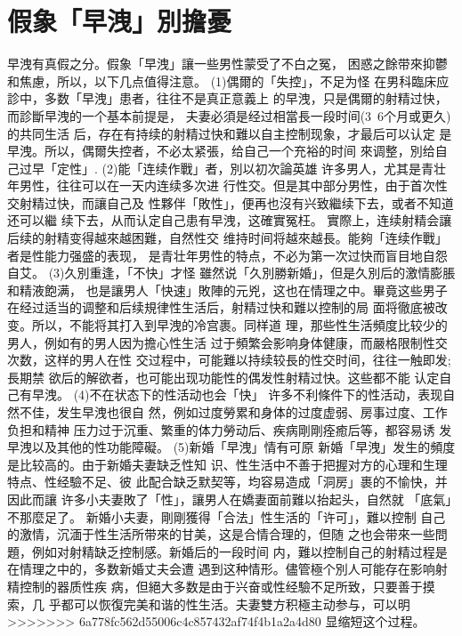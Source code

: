 \documentclass[12pt,UTF8]{ctexbook}
\begin{document}
\section{假象「早洩」別擔憂}

早洩有真假之分。假象「早洩」讓一些男性蒙受了不白之冤，
困惑之餘带來抑鬱和焦慮，所以，以下几点值得注意。
(1)偶爾的「失控」，不足为怪
在男科臨床应診中，多数「早洩」患者，往往不是真正意義上
的早洩，只是偶爾的射精过快，而診斷早洩的一个基本前提是，
夫妻必須是经过相當長一段时间(3~6个月或更久)的共同生活
后，存在有持续的射精过快和難以自主控制现象，才最后可以认定
是早洩。所以，偶爾失控者，不必太紧張，给自己一个充裕的时间
來调整，別给自己过早「定性」.
(2)能「连续作戰」者，別以初次論英雄
许多男人，尤其是青壮年男性，往往可以在一天内连续多次进
行性交。但是其中部分男性，由于首次性交射精过快，而讓自己及
性夥伴「敗性」，便再也沒有兴致繼续下去，或者不知道还可以繼
续下去，从而认定自己患有早洩，这確實冤枉。
實際上，连续射精会讓后续的射精变得越來越困難，自然性交
维持时间将越來越長。能夠「连续作戰」者是性能力强盛的表现，
是青壮年男性的特点，不必为第一次过快而盲目地自怨自艾。
(3)久別重逢，「不快」才怪
雖然说「久別勝新婚」，但是久別后的激情膨脹和精液飽满，
也是讓男人「快速」敗陣的元兇，这也在情理之中。畢竟这些男子
在经过适当的调整和后续規律性生活后，射精过快和難以控制的局
面将徹底被改变。所以，不能将其打入到早洩的冷宫裹。同样道
理，那些性生活頻度比较少的男人，例如有的男人因为擔心性生活
过于頻繁会影响身体健康，而嚴格限制性交次数，这样的男人在性
交过程中，可能難以持续较長的性交时间，往往一触即发;長期禁
欲后的解欲者，也可能出现功能性的偶发性射精过快。这些都不能
认定自己有早洩。
(4)不在状态下的性活动也会「快」
许多不利條件下的性活动，表现自然不佳，发生早洩也很自
然，例如过度勞累和身体的过度虚弱、房事过度、工作负担和精神
压力过于沉重、繁重的体力勞动后、疾病剛剛痊癒后等，都容易诱
发早洩以及其他的性功能障礙。
(5)新婚「早洩」情有可原
新婚「早洩」发生的頻度是比较高的。由于新婚夫妻缺乏性知
识、性生活中不善于把握对方的心理和生理特点、性经驗不足、彼
此配合缺乏默契等，均容易造成「洞房」裹的不愉快，并因此而讓
许多小夫妻敗了「性」，讓男人在嬌妻面前難以抬起头，自然就
「底氣」不那麼足了。
新婚小夫妻，剛剛獲得「合法」性生活的「许可」，難以控制
自己的激情，沉湎于性生活所带來的甘美，这是合情合理的，但随
之也会带來一些問題，例如对射精缺乏控制感。新婚后的一段时间
内，難以控制自己的射精过程是在情理之中的，多数新婚丈夫会遭
遇到这种情形。儘管極个別人可能存在影响射精控制的器质性疾
病，但絕大多数是由于兴奋或性经驗不足所致，只要善于摸索，几
乎都可以恢復完美和谐的性生活。夫妻雙方积極主动参与，可以明
>>>>>>> 6a778fc562d55006c4c857432af74f4b1a2a4d80
显缩短这个过程。
\end{document}

